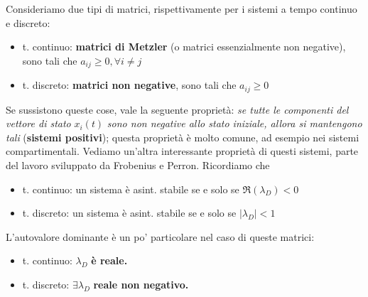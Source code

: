 \documentclass[10pt,a4paper]{book}
\begin{document}
Consideriamo due tipi di matrici, rispettivamente per i sistemi a tempo continuo e discreto:
\begin{itemize}
	\item t. continuo: \textbf{matrici di Metzler} (o matrici essenzialmente non negative), sono tali che $a_{ij} \geqslant 0,\forall i\neq j$
	\item t. discreto: \textbf{matrici non negative}, sono tali che $a_{ij} \geqslant 0$
\end{itemize}

Se sussistono queste cose, vale la seguente proprietà: \textit{se tutte le componenti del vettore di stato }$x_i(t)$\textit{ sono non negative allo stato iniziale, allora si mantengono tali} (\textbf{sistemi positivi}); questa proprietà è molto comune, ad esempio nei sistemi compartimentali. Vediamo un'altra interessante proprietà di questi sistemi, parte del lavoro sviluppato da Frobenius e Perron. Ricordiamo che
\begin{itemize}
	\item t. continuo: un sistema è asint. stabile se e solo se $\Re(\lambda _D) < 0$
	\item t. discreto: un sistema è asint. stabile se e solo se $| \lambda _D| < 1$
\end{itemize}

L'autovalore dominante è un po' particolare nel caso di queste matrici:
\begin{itemize}
	\item t. continuo: $\lambda _D$ \textbf{è reale.}
	\item t. discreto: $\exists \lambda _D$ \textbf{reale non negativo.}
\end{itemize}
\end{document}
